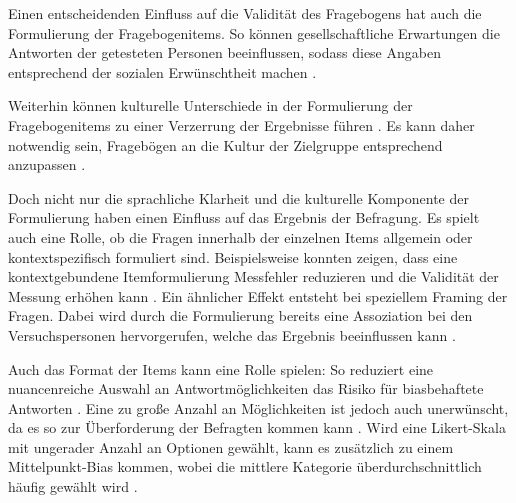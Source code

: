 Einen entscheidenden Einfluss auf die Validität des Fragebogens hat auch die Formulierung der Fragebogenitems.
So können gesellschaftliche Erwartungen die Antworten der getesteten Personen beeinflussen, sodass diese Angaben entsprechend der sozialen Erwünschtheit machen \citep{kemper2012kurzskala, kaminski2017situational}.

Weiterhin können kulturelle Unterschiede in der Formulierung der Fragebogenitems zu einer Verzerrung der Ergebnisse führen \citep{harzing2013challenges}.
Es kann daher notwendig sein, Fragebögen an die Kultur der Zielgruppe entsprechend anzupassen \citep{poortinga2013umgang}.

Doch nicht nur die sprachliche Klarheit und die kulturelle Komponente der Formulierung haben einen Einfluss auf das Ergebnis der Befragung.
Es spielt auch eine Rolle, ob die Fragen innerhalb der einzelnen Items allgemein oder kontextspezifisch formuliert sind.
Beispielsweise konnten  zeigen, dass eine kontextgebundene Itemformulierung Messfehler reduzieren und die Validität der Messung erhöhen kann \citep{bing2004incremental}.
Ein ähnlicher Effekt entsteht bei speziellem Framing der Fragen.
Dabei wird durch die Formulierung bereits eine Assoziation bei den Versuchspersonen hervorgerufen, welche das Ergebnis beeinflussen kann \citep{guyatt1999effect}.

Auch das Format der Items kann eine Rolle spielen:
So reduziert eine nuancenreiche Auswahl an Antwortmöglichkeiten das Risiko für biasbehaftete Antworten \citep{elson2017question}.
Eine zu große Anzahl an Möglichkeiten ist jedoch auch unerwünscht, da es so zur Überforderung der Befragten kommen kann \citep{knutsen2010question}.
Wird eine Likert-Skala mit ungerader Anzahl an Optionen gewählt, kann es zusätzlich zu einem Mittelpunkt-Bias kommen, wobei die mittlere Kategorie überdurchschnittlich häufig gewählt wird \citep{kulas2009middle}.